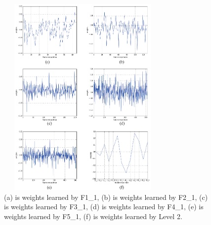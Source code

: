 \begin{figure}
\centering
\includegraphics[width=8.4cm, height = 10cm]{Figures/weights.eps}
\caption{(a) is weights learned by F1\_1, (b) is weights learned by F2\_1, (c) is weights learned by F3\_1, (d) is weights learned by F4\_1, (e) is weights learned by F5\_1, (f) is weights learned by Level 2.}
\label{11}
\end{figure}

